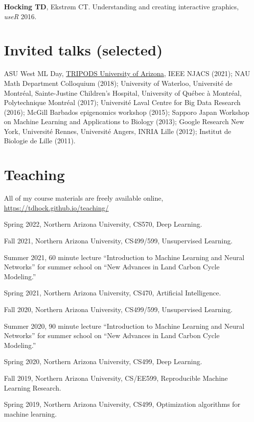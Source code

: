 \documentclass[margin,line]{res}
\begin{document}
\begin{resume}
{\bf Hocking TD}, Ekstr\o m CT. Understanding and creating interactive
graphics, {\it useR} 2016.

\section{\sc Invited talks (selected)}

ASU West ML Day,
\href{https://arizona.hosted.panopto.com/Panopto/Pages/Viewer.aspx?id=4e87c8d0-96d2-40d1-808c-ad16014c6962}{TRIPODS
  University of Arizona}, IEEE NJACS (2021); NAU Math Department
Colloquium (2018); University of Waterloo, Université de Montréal,
Sainte-Justine Children's Hospital, University of Québec à Montréal,
Polytechnique Montréal (2017); Universit\'e Laval Centre for Big Data
Research (2016); McGill Barbados epigenomics workshop (2015); Sapporo
Japan Workshop on Machine Learning and Applications to Biology (2013);
Google Research New York, Universit\'e Rennes, Universit\'e Angers,
INRIA Lille (2012); Institut de Biologie de Lille (2011).

\section{\sc Teaching}

All of my course materials are freely available online,
\url{https://tdhock.github.io/teaching/}

Spring 2022, Northern Arizona University, CS570, Deep Learning.

Fall 2021, Northern Arizona University, CS499/599, Unsupervised Learning.

Summer 2021, 60 minute lecture ``Introduction to Machine Learning and
Neural Networks'' for summer school on ``New Advances in Land Carbon
Cycle Modeling.''

Spring 2021, Northern Arizona University, CS470, Artificial Intelligence.

Fall 2020, Northern Arizona University, CS499/599, Unsupervised
Learning.

Summer 2020, 90 minute lecture ``Introduction to Machine Learning and
Neural Networks'' for summer school on ``New Advances in Land Carbon
Cycle Modeling.''

Spring 2020, Northern Arizona University, CS499, Deep Learning.

Fall 2019, Northern Arizona University, CS/EE599, Reproducible Machine
Learning Research.

Spring 2019, Northern Arizona University, CS499, Optimization
algorithms for machine learning.


\end{resume}
\end{document}
